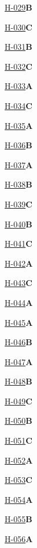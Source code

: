 \noindent\hyperref[q:H-029]{H-029}\hfill\textbf{B}\par
\noindent\hyperref[q:H-030]{H-030}\hfill\textbf{C}\par
\noindent\hyperref[q:H-031]{H-031}\hfill\textbf{B}\par
\noindent\hyperref[q:H-032]{H-032}\hfill\textbf{C}\par
\noindent\hyperref[q:H-033]{H-033}\hfill\textbf{A}\par
\noindent\hyperref[q:H-034]{H-034}\hfill\textbf{C}\par
\noindent\hyperref[q:H-035]{H-035}\hfill\textbf{A}\par
\noindent\hyperref[q:H-036]{H-036}\hfill\textbf{B}\par
\noindent\hyperref[q:H-037]{H-037}\hfill\textbf{A}\par
\noindent\hyperref[q:H-038]{H-038}\hfill\textbf{B}\par
\noindent\hyperref[q:H-039]{H-039}\hfill\textbf{C}\par
\noindent\hyperref[q:H-040]{H-040}\hfill\textbf{B}\par
\noindent\hyperref[q:H-041]{H-041}\hfill\textbf{C}\par
\noindent\hyperref[q:H-042]{H-042}\hfill\textbf{A}\par
\noindent\hyperref[q:H-043]{H-043}\hfill\textbf{C}\par
\noindent\hyperref[q:H-044]{H-044}\hfill\textbf{A}\par
\noindent\hyperref[q:H-045]{H-045}\hfill\textbf{A}\par
\noindent\hyperref[q:H-046]{H-046}\hfill\textbf{B}\par
\noindent\hyperref[q:H-047]{H-047}\hfill\textbf{A}\par
\noindent\hyperref[q:H-048]{H-048}\hfill\textbf{B}\par
\noindent\hyperref[q:H-049]{H-049}\hfill\textbf{C}\par
\noindent\hyperref[q:H-050]{H-050}\hfill\textbf{B}\par
\noindent\hyperref[q:H-051]{H-051}\hfill\textbf{C}\par
\noindent\hyperref[q:H-052]{H-052}\hfill\textbf{A}\par
\noindent\hyperref[q:H-053]{H-053}\hfill\textbf{C}\par
\noindent\hyperref[q:H-054]{H-054}\hfill\textbf{A}\par
\noindent\hyperref[q:H-055]{H-055}\hfill\textbf{B}\par
\noindent\hyperref[q:H-056]{H-056}\hfill\textbf{A}\par
